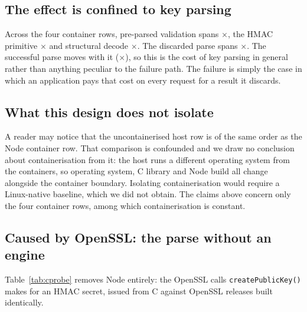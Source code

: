 \documentclass[pdflatex,sn-basic,twocolumn]{sn-jnl}%
\begin{document}
\subsection{The effect is confined to key parsing}

Across the four container rows, pre-parsed validation spans
\SpanJwtPreparsed$\times$, the HMAC primitive \SpanHmacString$\times$ and
structural decode \SpanDecodeOnly$\times$. The discarded parse spans
\SpanProbeThrows$\times$. The successful parse moves with it
(\SpanProbeSucceeds$\times$), so this is the cost of key parsing in general
rather than anything peculiar to the failure path. The failure is simply the case
in which an application pays that cost on every request for a result it discards.

\subsection{What this design does not isolate}

A reader may notice that the uncontainerised host row is of the same order as the
Node \NodeTwentySixGlibcNodeMajor{} container row. That comparison is confounded
and we draw no conclusion about containerisation from it: the host runs a
different operating system from the containers, so operating system, C library
and Node build all change alongside the container boundary. Isolating
containerisation would require a Linux-native baseline, which we did not obtain.
The claims above concern only the four container rows, among which
containerisation is constant.

\subsection{Caused by OpenSSL: the parse without an engine}\label{sec:rq2-causal}

Table~\ref{tab:cprobe} removes Node entirely: the OpenSSL calls
\texttt{createPublicKey()} makes for an HMAC secret, issued from C against
\CProbeVersionCount{} OpenSSL releases built identically.
\end{document}
